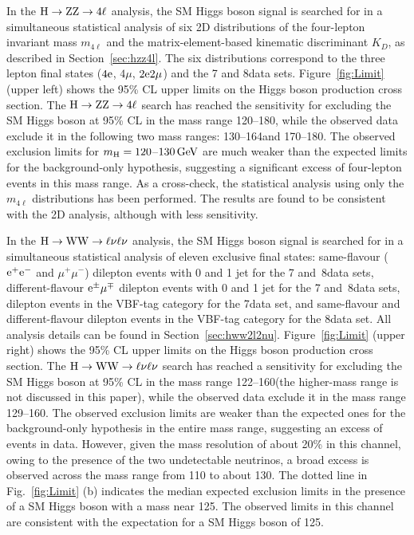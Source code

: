 \documentclass[11pt,twoside,a4paper,cmspaper,final,collab]{cms-tdr}
\begin{document}
In the $\mathrm{H} \rightarrow  \mathrm{Z}\mathrm{Z}   \rightarrow 4\ell$ analysis,
the SM Higgs boson signal is searched for in a simultaneous statistical analysis of six 2D distributions
of the four-lepton invariant mass $m_{4\ell}$ and the matrix-element-based kinematic discriminant $K_D$,
as described in Section~\ref{sec:hzz4l}.
The six distributions correspond to the three lepton final states ($4\mathrm{e}$, $4\mu$, $2\mathrm{e}2\mu$) and
the 7 and 8\TeV data sets.
Figure~\ref{fig:Limit} (upper left) shows the 95\% CL upper limits
on the Higgs boson production cross section. The $\mathrm{H} \to \mathrm{Z}\mathrm{Z}  \to 4\ell$ search has reached
the sensitivity for excluding the SM Higgs boson at 95\% CL
in the mass range 120--180\GeV,
while the observed data exclude it in the following two mass ranges:
130--164\GeV and 170--180\GeV.
The observed exclusion limits for $m_{\mathrm{H}}=120$--$130\,\text{Ge\hspace{-.08em}V}$
are much weaker than the expected limits for the background-only hypothesis,
suggesting a significant excess of four-lepton events in this mass range.
As a cross-check, the statistical analysis using only the  $m_{4\ell}$ distributions has been performed.
The results are found to be consistent with the 2D analysis, although with less sensitivity.





In the $\mathrm{H} \to \mathrm{W}\mathrm{W} \to \ell\nu\ell\nu$ analysis,
the SM Higgs boson signal is searched for in a simultaneous statistical analysis
of eleven exclusive final states:
same-flavour ($\mathrm{e}^+\mathrm{e}^-$ and $\mu^+\mu^-$) dilepton events with 0 and 1 jet for the 7 and~8\TeV data sets,
different-flavour $\mathrm{e}^{\pm}\mu^{\mp}$ dilepton events with 0 and 1 jet for the 7 and~8\TeV data sets,
dilepton events in the VBF-tag category for the 7\TeV data set,
and same-flavour and different-flavour dilepton events in the VBF-tag category for the 8\TeV data set.
All analysis details can be found in Section~\ref{sec:hww2l2nu}.
Figure~\ref{fig:Limit} (upper right) shows the 95\% CL upper limits
on the Higgs boson production cross section. The $\mathrm{H} \to \mathrm{W}\mathrm{W} \to \ell\nu\ell\nu$ search has reached
a sensitivity for excluding the SM Higgs boson at 95\% CL
in the mass range 122--160\GeV (the higher-mass range is not discussed in this paper),
while the observed data exclude it in the mass range 129--160\GeV.
The observed exclusion limits are weaker than the expected ones
for the background-only hypothesis in the entire mass range,
suggesting an excess of events in data.
However, given the mass resolution of about 20\% in this channel, owing to the presence of the two undetectable neutrinos,
a broad excess is observed across the mass range from 110 to about 130\GeV.
The dotted line in Fig.~\ref{fig:Limit} (b) indicates the median expected exclusion limits
in the presence of a SM Higgs boson with a mass near 125\GeV. The observed limits in this channel
are consistent with the expectation for a SM Higgs boson of 125\GeV.
\end{document}
